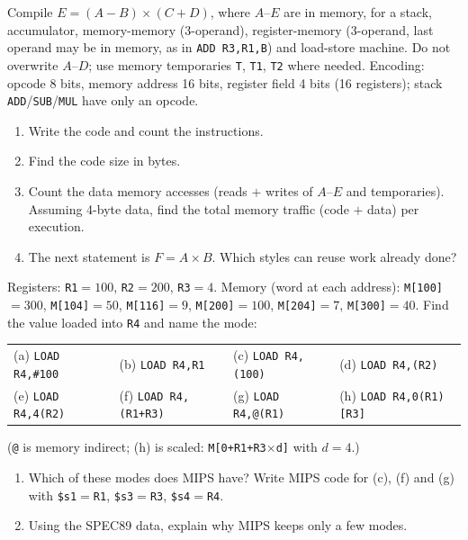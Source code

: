 \begin{exercise}\label{q:isa-styles}
Compile $E=(A-B)\times(C+D)$, where $A$--$E$ are in memory, for a stack,
accumulator, memory-memory (3-operand), register-memory (3-operand, last operand
may be in memory, as in \texttt{ADD R3,R1,B}) and load-store machine. Do not
overwrite $A$--$D$; use memory temporaries \texttt{T}, \texttt{T1},
\texttt{T2} where needed.
Encoding: opcode 8 bits, memory address 16 bits, register field 4 bits (16
registers); stack \texttt{ADD}/\texttt{SUB}/\texttt{MUL} have only an opcode.
\begin{enumerate}[label=(\alph*),leftmargin=*]
  \item Write the code and count the instructions.
  \item Find the code size in bytes.
  \item Count the data memory accesses (reads $+$ writes of $A$--$E$ and
  temporaries). Assuming 4-byte data, find the total memory traffic (code $+$
  data) per execution.
  \item The next statement is $F=A\times B$. Which styles can reuse work
  already done?
\end{enumerate}
\end{exercise}

\begin{exercise}\label{q:isa-modes}
Registers: \texttt{R1}$=100$, \texttt{R2}$=200$, \texttt{R3}$=4$. Memory
(word at each address): \texttt{M[100]}$=300$, \texttt{M[104]}$=50$,
\texttt{M[116]}$=9$, \texttt{M[200]}$=100$, \texttt{M[204]}$=7$,
\texttt{M[300]}$=40$. Find the value loaded into \texttt{R4} and name the mode:
\begin{center}
\small
\begin{tabular}{@{}llll@{}}
(a) \texttt{LOAD R4,\#100} & (b) \texttt{LOAD R4,R1} & (c) \texttt{LOAD R4,(100)} & (d) \texttt{LOAD R4,(R2)} \\
(e) \texttt{LOAD R4,4(R2)} & (f) \texttt{LOAD R4,(R1+R3)} & (g) \texttt{LOAD R4,@(R1)} & (h) \texttt{LOAD R4,0(R1)[R3]} \\
\end{tabular}
\end{center}
(\texttt{@} is memory indirect; (h) is scaled: \texttt{M[0+R1+R3$\times$d]} with $d=4$.)
\begin{enumerate}[label=(\alph*),leftmargin=*,start=9]
  \item Which of these modes does MIPS have? Write MIPS code for (c), (f) and
  (g) with \texttt{\$s1}$=$\texttt{R1}, \texttt{\$s3}$=$\texttt{R3},
  \texttt{\$s4}$=$\texttt{R4}.
  \item Using the SPEC89 data, explain why MIPS keeps only a few modes.
\end{enumerate}
\end{exercise}

